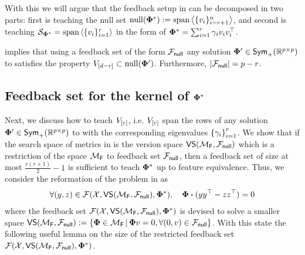 With this we will argue that the feedback setup in  can be decomposed in two parts: first is teaching the null set $ \mathrm{null}({\boldsymbol{\Phi}^*}):= \text{span} \left<\{v_i\}_{i=r+1}^n\right>$, and second is teaching $\mathcal{S}_{\boldsymbol{\Phi}^*} = \text{span} \left<\{v_i\}_{i=1}^r\right>$ in the form of $\boldsymbol{\Phi}^* = \sum_{i=1}^r \gamma_i v_iv_i^{\top}$. 

 implies that using a feedback set of the form ${\mathcal{F}}_{\textsf{null}}$ any solution $\boldsymbol{\Phi}' \in \textsf{Sym}_{+}(\mathbb{R}^{p\times p})$ to  satisfies the property $V_{\left[d - r\right]} \subset \mathrm{null}({\boldsymbol{\Phi}'})$. Furthermore, $|{\mathcal{F}}_{\textsf{null}}| = p - r$. 

\subsection{Feedback set for the kernel of \texorpdfstring{$\boldsymbol{\Phi}^*$}{phi*}}
Next, we discuss how to teach $V_{\left[r\right]}$, i.e. $V_{\left[r\right]}$ span the rows of any solution $\boldsymbol{\Phi}' \in \textsf{Sym}_{+}(\mathbb{R}^{p\times p})$ to  with the corresponding eigenvalues $\left\{\gamma_i\right\}_{i=1}^r$. We show that if the search space of metrics in  is the version space $\textsf{VS}({\mathcal{M}}_{\textsf{F}},{\mathcal{F}}_{\textsf{null}})$  which is a restriction of the space ${\mathcal{M}}_{\textsf{F}}$ to feedback set ${\mathcal{F}}_{\textsf{null}}$, then a feedback set of size at most $\frac{r(r+1)}{2} -1$ is sufficient to teach $\boldsymbol{\Phi}^*$ up to feature equivalence. Thus, we consider the reformation of the problem in  as 
\begin{align}
  \forall (y,z) \in {\mathcal{F}}({\mathcal{X}},\textsf{VS}({\mathcal{M}}_{\textsf{F}},{\mathcal{F}}_{\textsf{null}}),\boldsymbol{\Phi}^*), \quad \boldsymbol{\Phi} \boldsymbol{\cdot} (yy^{\top} - zz^{\top})  = 0  \label{eq: redorthosat}
\end{align}
where the feedback set ${\mathcal{F}}({\mathcal{X}},\textsf{VS}({\mathcal{M}}_{\textsf{F}},{\mathcal{F}}_{\textsf{null}}),\boldsymbol{\Phi}^*)$ is devised to solve a smaller space $\textsf{VS}({\mathcal{M}}_{\textsf{F}},{\mathcal{F}}_{\textsf{null}}) := \left\{\boldsymbol{\Phi} \in {\mathcal{M}}_{\textsf{F}} \,|\, \boldsymbol{\Phi} v = 0, \forall (0,v) \in {\mathcal{F}}_{\textsf{null}}\right\}$. With this state the following useful lemma on the size of the restricted feedback set ${\mathcal{F}}({\mathcal{X}},\textsf{VS}({\mathcal{M}}_{\textsf{F}},{\mathcal{F}}_{\textsf{null}}),\boldsymbol{\Phi}^*)$.




